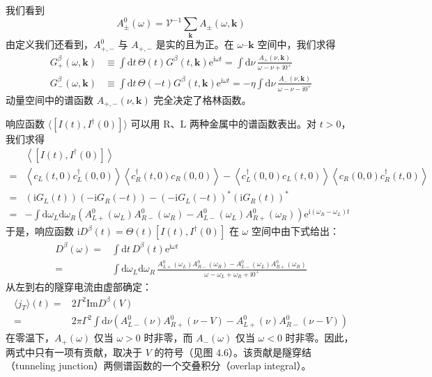 我们看到
\begin{equation*}
A_{\pm}^{0}(\omega) = \mathcal{V}^{-1}\sum_{\pmb{k}}A_{\pm}(\omega,\pmb{k})
\end{equation*}
由定义我们还看到，$A_{+,-}^{0}$ 与 $A_{+,-}$ 是实的且为正。在 $\omega$--$\pmb{k}$ 空间中，我们求得
\begin{align*}
G_{+}^{\beta}(\omega,\pmb{k}) &\equiv \int \mathrm{d}t\,\Theta(t)G^{\beta}(t,\pmb{k})\mathrm{e}^{\mathrm{i}\omega t} = \int \mathrm{d}\nu\,\frac{A_{+}(\nu,\pmb{k})}{\omega - \nu + \mathrm{i}0^{+}}\\
G_{-}^{\beta}(\omega,\pmb{k}) &\equiv \int \mathrm{d}t\,\Theta(-t)G^{\beta}(t,\pmb{k})\mathrm{e}^{\mathrm{i}\omega t} = -\eta \int \mathrm{d}\nu\,\frac{A_{-}(\nu,\pmb{k})}{\omega - \nu - \mathrm{i}0^{+}} \tag{4.2.14}
\end{align*}
动量空间中的谱函数 $A_{+,-}(\nu,\pmb{k})$ 完全决定了格林函数。


响应函数 $\langle [I(t), I^{\dagger}(0)]\rangle$ 可以用 R、L 两种金属中的谱函数表出。对 $t > 0$，我们求得
\begin{align*}
&\left\langle [I(t), I^{\dagger}(0)]\right\rangle\\
={}& \left\langle c_{L}(t,0)c_{L}^{\dagger}(0,0)\right\rangle\left\langle c_{R}^{\dagger}(t,0)c_{R}(0,0)\right\rangle - \left\langle c_{L}^{\dagger}(0,0)c_{L}(t,0)\right\rangle\left\langle c_{R}(0,0)c_{R}^{\dagger}(t,0)\right\rangle\\
={}& (\mathrm{i}G_{L}(t))(-\mathrm{i}G_{R}(-t)) - (-\mathrm{i}G_{L}(-t))^{*}(\mathrm{i}G_{R}(t))^{*} \tag{4.2.15}\\
={}& -\int \mathrm{d}\omega_{L}\mathrm{d}\omega_{R}\left(A_{L+}^{0}(\omega_{L})A_{R-}^{0}(\omega_{R}) - A_{L-}^{0}(\omega_{L})A_{R+}^{0}(\omega_{R})\right)\mathrm{e}^{\mathrm{i}(\omega_{R}-\omega_{L})t}
\end{align*}
于是，响应函数 $\mathrm{i}D^{\beta}(t) = \Theta(t)[I(t), I^{\dagger}(0)]$ 在 $\omega$ 空间中由下式给出：
\begin{align*}
D^{\beta}(\omega) = {}& \int \mathrm{d}t\, D^{\beta}(t)\mathrm{e}^{\mathrm{i}\omega t} \tag{4.2.16}\\
={}& \int \mathrm{d}\omega_{L}\mathrm{d}\omega_{R}\,\frac{A_{L+}^{0}(\omega_{L})A_{R-}^{0}(\omega_{R}) - A_{L-}^{0}(\omega_{L})A_{R+}^{0}(\omega_{R})}{\omega - \omega_{L} + \omega_{R} + \mathrm{i}0^{+}}
\end{align*}
从左到右的隧穿电流由虚部确定：
\begin{align*}
\langle j_{T}\rangle(t) ={}& 2\Gamma^{2}\mathrm{Im}D^{\beta}(V)\\
={}& 2\pi\Gamma^{2}\int \mathrm{d}\nu\left(A_{L-}^{0}(\nu)A_{R+}^{0}(\nu - V) - A_{L+}^{0}(\nu)A_{R-}^{0}(\nu - V)\right) \tag{4.2.17}
\end{align*}
在零温下，$A_{+}(\omega)$ 仅当 $\omega > 0$ 时非零，而 $A_{-}(\omega)$ 仅当 $\omega < 0$ 时非零。因此，两式中只有一项有贡献，取决于 $V$ 的符号（见图 4.6）。该贡献是隧穿结（tunneling junction）两侧谱函数的一个交叠积分（overlap integral）。

